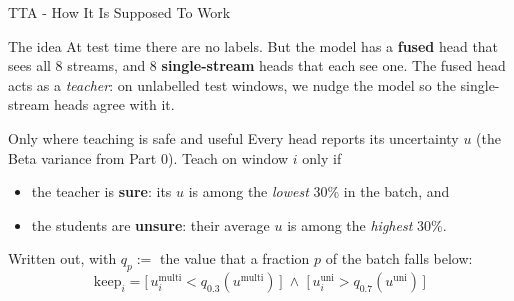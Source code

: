 \documentclass[aspectratio=169]{beamer}
\newcommand{\hl}[1]{\textcolor{coolpurple}{\textbf{#1}}}
\begin{document}
	\begin{frame}{TTA - How It Is Supposed To Work}
		\begin{block}{The idea}
			\small
			At test time there are no labels. But the model has a \hl{fused} head that sees all
			8 streams, and 8 \hl{single-stream} heads that each see one. The fused head acts as a
			\emph{teacher}: on unlabelled test windows, we nudge the model so the single-stream
			heads agree with it.
		\end{block}
		\begin{block}{Only where teaching is safe and useful}
			\small
			Every head reports its uncertainty $u$ (the Beta variance from Part 0). Teach on
			window $i$ only if
			\begin{itemize}
				\item the teacher is \textbf{sure}: its $u$ is among the \emph{lowest} 30\% in the batch, and
				\item the students are \textbf{unsure}: their average $u$ is among the \emph{highest} 30\%.
			\end{itemize}
			Written out, with $q_p :=$ the value that a fraction $p$ of the batch falls below:
			$$ \text{keep}_i = \bigl[\,u^{\text{multi}}_i < q_{0.3}(u^{\text{multi}})\,\bigr]
			\;\wedge\; \bigl[\,u^{\text{uni}}_i > q_{0.7}(u^{\text{uni}})\,\bigr] $$
		\end{block}
	\end{frame}
\end{document}
